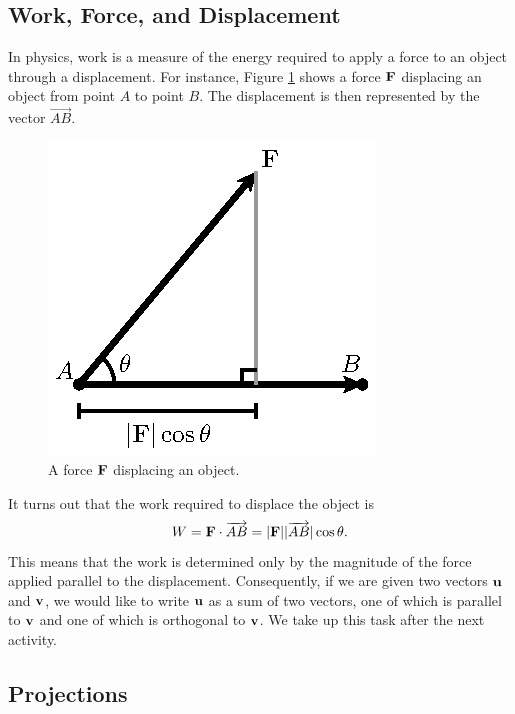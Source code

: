 \subsection*{Work, Force, and Displacement}

In physics, work is a measure of the energy required to apply a force
to an object through a displacement.  For instance, Figure
\ref{F:9.3.Work} shows a force $\mathbf{F}$ displacing an object from point
$A$ to point $B$.  The displacement is then represented by the
vector $\overrightarrow{AB}$.  

\begin{figure}[ht]
  \begin{center}
    \includegraphics{figures/fig_9_3_work_1.eps}
  \end{center}
  \caption{A force $\mathbf{F}$ displacing an object.}
  \label{F:9.3.Work}
\end{figure}

It turns out that the work required to displace the object is
$$
W = \mathbf{F}\cdot\overrightarrow{AB} = |\mathbf{F}||\overrightarrow{AB}|\cos\theta.
$$
This means that the work is determined only by the magnitude of the
force applied parallel to the displacement.  Consequently, if we are
given two vectors $\mathbf{u}$ and $\mathbf{v}$, we would like to write $\mathbf{u}$ as a
sum of two vectors, one of which is parallel to $\mathbf{v}$ and one of which
is orthogonal to $\mathbf{v}$.  We take up this task after the next activity.



\subsection*{Projections}

